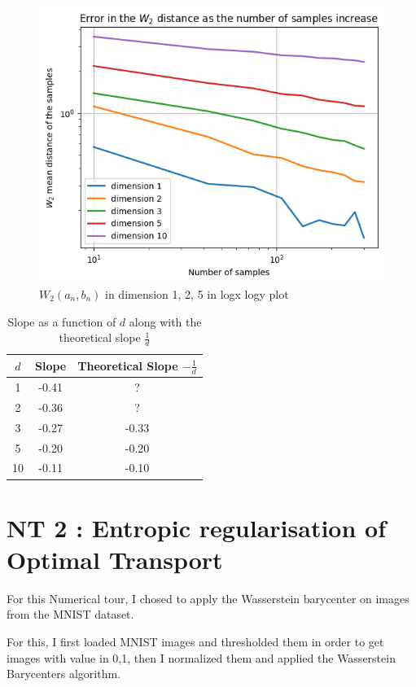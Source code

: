 \documentclass[a4paper,11pt]{article}
\begin{document}
\begin{figure}
    \centering
    \includegraphics[width=0.8\linewidth]{image/123510logconv.png}
    \caption{$W_2(a_n, b_n)$ in dimension 1, 2, 5  in logx logy plot}
    \label{fig:2}
\end{figure}
\begin{table}[h!]
\centering
\begin{tabular}{ccc}
\toprule
$d$ & Slope & Theoretical Slope \( -\frac{1}{d} \) \\
\midrule
1  &-0.41 & ? \\
2  &-0.36 & ? \\
3  &-0.27 & -0.33 \\
5  &-0.20 & -0.20 \\
10 &-0.11  & -0.10 \\
\bottomrule
\end{tabular}
\caption{Slope as a function of \( d \) along with the theoretical slope \( \frac{1}{d} \)}
\label{tab:slope_vs_n}
\end{table}

\section{NT 2 : Entropic regularisation of Optimal Transport}

For this Numerical tour, I chosed to apply the Wasserstein barycenter on images from the MNIST dataset.

For this, I first loaded MNIST images and thresholded them in order to get images with value in {0,1}, then I normalized them and applied the Wasserstein Barycenters algorithm.
\end{document}

